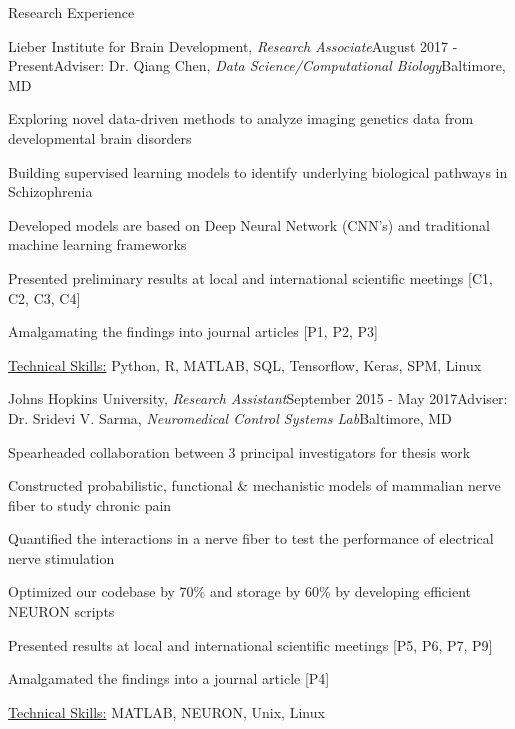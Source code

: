\documentclass{resume}
\begin{document}
  \begin{rSection}{Research Experience}
\begin{rSubsection}{Lieber Institute for Brain Development, \textit{Research Associate}}{August 2017 - Present}{Adviser: Dr. Qiang Chen, \textit{Data Science/Computational Biology}}{Baltimore, MD}
\item Exploring novel data-driven methods to analyze imaging genetics data from developmental brain disorders
\item Building supervised learning models to identify underlying biological pathways in Schizophrenia
\item Developed models are based on Deep Neural Network (CNN's) and traditional machine learning frameworks
\item Presented preliminary results at local and international scientific meetings [C1, C2, C3, C4]
\item Amalgamating the findings into journal articles [P1, P2, P3] 
\item \uline{Technical Skills:} Python, R, MATLAB, SQL, Tensorflow, Keras, SPM, Linux
    \end{rSubsection}

    \begin{rSubsection}{Johns Hopkins University, \textit{Research Assistant}}{September 2015 - May 2017}{Adviser: Dr. Sridevi V. Sarma, \textit{Neuromedical Control Systems Lab}}{Baltimore, MD}
\item Spearheaded collaboration between 3 principal investigators for thesis work
\item Constructed probabilistic, functional \& mechanistic models of mammalian nerve fiber to study chronic pain
\item Quantified the interactions in a nerve fiber to test the performance of electrical nerve stimulation
\item Optimized our codebase by 70\% and storage by 60\% by developing efficient NEURON scripts
\item Presented results at local and international scientific meetings [P5, P6, P7, P9]
\item Amalgamated the findings into a journal article [P4]
\item \uline{Technical Skills:} MATLAB, NEURON, Unix, Linux
    \end{rSubsection}
  

\end{rSection}
\end{document}
